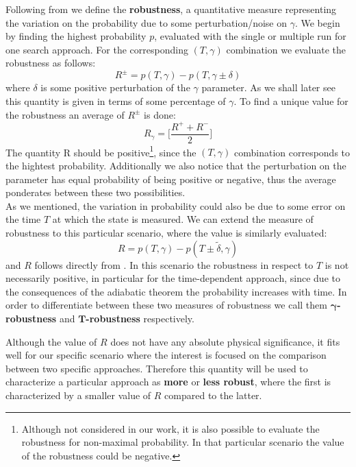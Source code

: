         Following from \citet{SH.HungS.Hietala2019} we define the \textbf{robustness}, a quantitative measure representing the variation on the probability due to some perturbation/noise on $\gamma$.
        We begin by finding the highest probability $p$, evaluated with the single or multiple run for one search approach. For the corresponding $(T,\gamma)$ combination we evaluate the robustness as follows:
        \begin{equation}
            R ^\pm = p(T, \gamma) - p(T, \gamma \pm \delta)
        \end{equation}
        where $\delta$ is some positive perturbation of the $\gamma$ parameter. As we shall later see this quantity is given in terms of some percentage of $\gamma$. To find a unique value for the robustness an average of $R^\pm$ is done:
        \begin{equation}
            R_\gamma = \bigg[\frac{R^++ R^-}{2}\bigg]
            \label{eq:robustness}
        \end{equation}
        The quantity R should be positive\footnote{ Although not considered in our work, it is also possible to evaluate the robustness for non-maximal probability. In that particular scenario the value of the robustness could be negative.}, since the $(T,\gamma)$ combination corresponds to the hightest probability. Additionally we also notice that the perturbation on the parameter has equal probability of being positive or negative, thus the average ponderates between these two possibilities. \\

        \noindent
        As we mentioned, the variation in probability could also be due to some error on the time $T$ at which the state is measured. We can extend the measure of robustness to this particular scenario, where the value is similarly evaluated:
        \begin{equation}
            R = p(T, \gamma) - p(T \pm \tilde{\delta}, \gamma )
        \end{equation}
        and $R$ follows directly from . In this scenario the robustness in respect to $T$ is not necessarily positive, in particular for the time-dependent approach, since due to the consequences of the adiabatic theorem the probability increases with time.
        In order to differentiate between these two measures of robustness we call them \textbf{$\bm{\gamma}$-robustness} and \textbf{$\bm{T}$-robustness} respectively.


        Although the value of $R$ does not have any absolute physical significance, it fits well for our specific scenario where the interest is focused on the comparison between two specific approaches. Therefore this quantity will be used to characterize a particular approach as \textbf{more} or \textbf{less robust}, where the first is characterized by a smaller value of $R$ compared to the latter.

